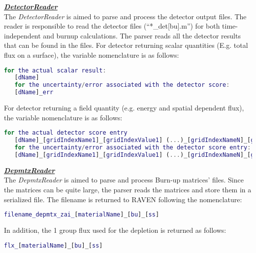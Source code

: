 \textit{\textbf{\underline{DetectorReader}}}
\\The \textit{DetectorReader} is aimed to parse and process the detector output files.
The reader is responsible to read the detector files (``*\_det[bu].m'') for both time-independent and burnup calculations.
The parser reads all the detector results that can
be found in the files.
For detector returning scalar quantities (E.g. total flux on a surface), the variable nomenclature is as follows:
  \begin{lstlisting}[language={matlab}]
   for the actual scalar result:
   [dName]
   for the uncertainty/error associated with the detector score:
   [dName]_err
\end{lstlisting}
For detector returning a field quantity (e.g. energy and spatial dependent flux), the variable nomenclature is as follows:
  \begin{lstlisting}[language={matlab}]
   for the actual detector score entry
   [dName]_[gridIndexName1]_[gridIndexValue1] (...)_[gridIndexNameN]_[gridIndexValueN]  ]
   for the uncertainty/error associated with the detector score entry:
   [dName]_[gridIndexName1]_[gridIndexValue1] (...)_[gridIndexNameN]_[gridIndexValueN]_err
\end{lstlisting}


\textit{\textbf{\underline{DepmtxReader}}}
\\The \textit{DepmtxReader} is aimed to parse and process Burn-up matrices’ files.
Since the matrices can be quite large, the parser reads the matrices and store them in a serialized file.
The filename is returned to RAVEN following the nomenclature:
  \begin{lstlisting}[language={matlab}]
    filename_depmtx_zai_[materialName]_[bu]_[ss]
\end{lstlisting}
 In addition, the 1 group flux used for the depletion is returned as follows:
  \begin{lstlisting}[language={matlab}]
     flx_[materialName]_[bu]_[ss]
\end{lstlisting} 


